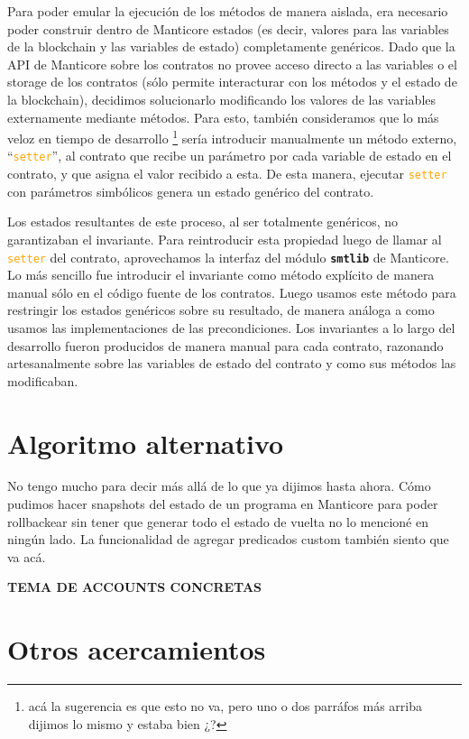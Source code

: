 Para poder emular la ejecución de los métodos de manera aislada, era necesario poder construir dentro de Manticore estados (es decir, valores para las variables de la blockchain y las variables de estado) completamente genéricos.
Dado que la API de Manticore sobre los contratos no provee acceso directo a las variables o el storage de los contratos (sólo permite interacturar con los métodos y el estado de la blockchain), decidimos solucionarlo modificando los valores de las variables externamente mediante métodos.
Para esto, también consideramos que lo más veloz en tiempo de desarrollo \footnote{acá la sugerencia es que esto no va, pero uno o dos parráfos más arriba dijimos lo mismo y estaba bien ¿?} sería introducir manualmente un método externo, ``\textcolor{orange}{\texttt{setter}}'', al contrato que recibe un parámetro por cada variable de estado en el contrato, y que asigna el valor recibido a esta.
De esta manera, ejecutar \textcolor{orange}{\texttt{setter}} con parámetros simbólicos genera un estado genérico del contrato.

Los estados resultantes de este proceso, al ser totalmente genéricos, no garantizaban el invariante.
Para reintroducir esta propiedad luego de llamar al \textcolor{orange}{\texttt{setter}} del contrato, aprovechamos la interfaz del módulo \texttt{\textbf{smtlib}} de Manticore.
Lo más sencillo fue introducir el invariante como método explícito de manera manual sólo en el código fuente de los contratos.
Luego usamos este método para restringir los estados genéricos sobre su resultado, de manera análoga a como usamos las implementaciones de las precondiciones.
Los invariantes a lo largo del desarrollo fueron producidos de manera manual para cada contrato, razonando artesanalmente sobre las variables de estado del contrato y como sus métodos las modificaban.

\section{Algoritmo alternativo}
No tengo mucho para decir más allá de lo que ya dijimos hasta ahora.
Cómo pudimos hacer snapshots del estado de un programa en Manticore para poder rollbackear sin tener que generar todo el estado de vuelta no lo mencioné en ningún lado.
La funcionalidad de agregar predicados custom también siento que va acá.

\textbf{TEMA DE ACCOUNTS CONCRETAS}

\section{Otros acercamientos}
